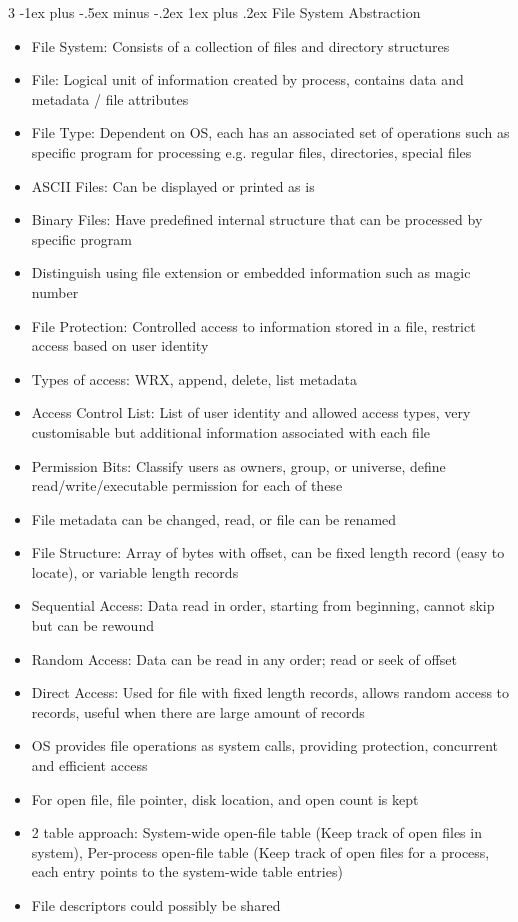 \documentclass[10pt, landscape]{article}
\makeatletter
\renewcommand{\subsection}{\@startsection{subsection}{3}{0mm}%
                                {-1ex plus -.5ex minus -.2ex}%
                                {1ex plus .2ex}%
                                {\normalfont\small\bfseries}}%
\makeatother
\begin{document}
\begin{multicols*}{3}
\subsection{File System Abstraction}
\begin{itemize}
    \item File System: Consists of a collection of files and directory structures
    \item File: Logical unit of information created by process, contains data and metadata / file attributes
    \item File Type: Dependent on OS, each has an associated set of operations such as specific program for processing e.g. regular files, directories, special files
    \item ASCII Files: Can be displayed or printed as is
    \item Binary Files: Have predefined internal structure that can be processed by specific program
    \item Distinguish using file extension or embedded information such as magic number
    \item File Protection: Controlled access to information stored in a file, restrict access based on user identity
    \item Types of access: WRX, append, delete, list metadata
    \item Access Control List: List of user identity and allowed access types, very customisable but additional information associated with each file
    \item Permission Bits: Classify users as owners, group, or universe, define read/write/executable permission for each of these
    \item File metadata can be changed, read, or file can be renamed
    \item File Structure: Array of bytes with offset, can be fixed length record (easy to locate), or variable length records
    \item Sequential Access: Data read in order, starting from beginning, cannot skip but can be rewound
    \item Random Access: Data can be read in any order; read or seek of offset
    \item Direct Access: Used for file with fixed length records, allows random access to records, useful when there are large amount of records
    \item OS provides file operations as system calls, providing protection, concurrent and efficient access
    \item For open file, file pointer, disk location, and open count is kept
    \item 2 table approach: System-wide open-file table (Keep track of open files in system), Per-process open-file table (Keep track of open files for a process, each entry points to the system-wide table entries)
    \item File descriptors could possibly be shared
\end{itemize}


\end{multicols*}
\end{document}
